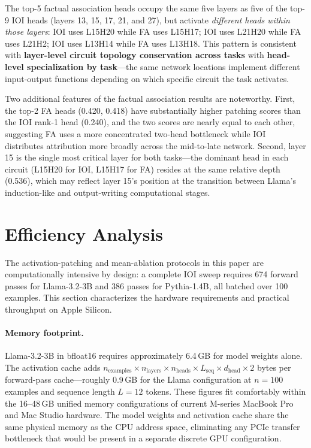 \documentclass[11pt,a4paper]{article}
\begin{document}
The top-5 factual association heads occupy the same five layers as five of the top-9
IOI heads (layers 13, 15, 17, 21, and 27), but activate \emph{different heads within
those layers}: IOI uses L15H20 while FA uses L15H17; IOI uses L21H20 while FA uses
L21H2; IOI uses L13H14 while FA uses L13H18. This pattern is consistent with
\textbf{layer-level circuit topology conservation across tasks} with \textbf{head-level
specialization by task}---the same network locations implement different input-output
functions depending on which specific circuit the task activates.

Two additional features of the factual association results are noteworthy. First, the
top-2 FA heads (0.420, 0.418) have substantially higher patching scores than the IOI
rank-1 head (0.240), and the two scores are nearly equal to each other, suggesting FA
uses a more concentrated two-head bottleneck while IOI distributes attribution more
broadly across the mid-to-late network. Second, layer 15 is the single most critical
layer for both tasks---the dominant head in each circuit (L15H20 for IOI, L15H17 for
FA) resides at the same relative depth (0.536), which may reflect layer 15's position
at the transition between Llama's induction-like and output-writing computational
stages.

\section{Efficiency Analysis}
\label{sec:efficiency}

The activation-patching and mean-ablation protocols in this paper are computationally
intensive by design: a complete IOI sweep requires 674 forward passes for Llama-3.2-3B
and 386 passes for Pythia-1.4B, all batched over 100 examples. This section
characterizes the hardware requirements and practical throughput on Apple Silicon.

\paragraph{Memory footprint.}
Llama-3.2-3B in bfloat16 requires approximately 6.4\,GB for model weights alone. The
activation cache adds $n_\text{examples} \times n_\text{layers} \times n_\text{heads}
\times L_\text{seq} \times d_\text{head} \times 2$ bytes per forward-pass
cache---roughly 0.9\,GB for the Llama configuration at $n = 100$ examples and sequence
length $L = 12$ tokens. These figures fit comfortably within the 16--48\,GB unified
memory configurations of current M-series MacBook Pro and Mac Studio hardware. The
model weights and activation cache share the same physical memory as the CPU address
space, eliminating any PCIe transfer bottleneck that would be present in a separate
discrete GPU configuration.
\end{document}

